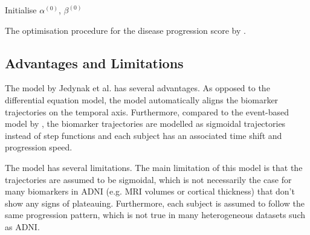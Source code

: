 \begin{algorithm}
 Initialise $\alpha^{(0)}$, $\beta^{(0)}$\;\label{alg:init}

  
 \caption{The optimisation procedure for the disease progression score by \cite{jedynak2012computational}.}
 \label{fig:algo_dps}
\end{algorithm}


\subsection{Advantages and Limitations}

The model by Jedynak et al. \cite{jedynak2012computational} has several advantages. As opposed to the differential equation model, the model automatically aligns the biomarker trajectories on the temporal axis. Furthermore, compared to the event-based model by \cite{fonteijn2012event}, the biomarker trajectories are modelled as sigmoidal trajectories instead of step functions and each subject has an associated time shift and progression speed. 

The model has several limitations. The main limitation of this model is that the trajectories are assumed to be sigmoidal, which is not necessarily the case for many biomarkers in ADNI (e.g. MRI volumes or cortical thickness) that don't show any signs of plateauing. Furthermore, each subject is assumed to follow the same progression pattern, which is not true in many heterogeneous datasets such as ADNI.


